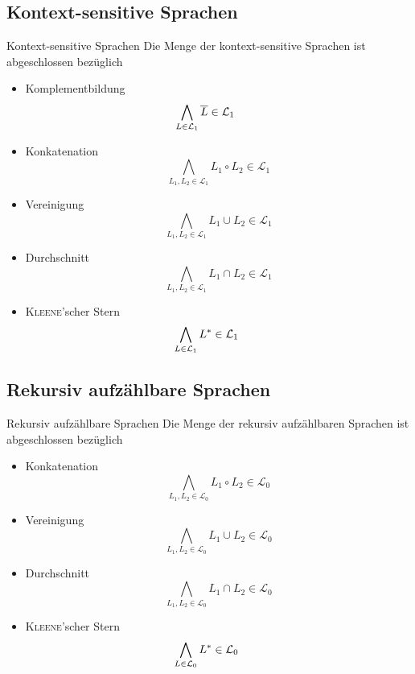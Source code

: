 \documentclass[]{beamer}
\begin{document}
\subsection{Kontext-sensitive Sprachen}
\begin{frame}[squeeze]{}
  \begin{block}{Kontext-sensitive Sprachen}
    Die Menge der kontext-sensitive Sprachen ist abgeschlossen bezüglich
    \begin{itemize}
      \item Komplementbildung
            \vspace*{-0.25em}
            \[\bigwedge_{L \in \mathcal{L}_1} \overline{L} \in \mathcal{L}_1 \hspace*{2.3em}\]
      \item Konkatenation
            \vspace*{-0.25em}
            \[\bigwedge_{L_1, L_2 \in \mathcal{L}_1} L_1 \circ L_2 \in \mathcal{L}_1\]
      \item Vereinigung
            \vspace*{-0.25em}
            \[\bigwedge_{L_1, L_2 \in \mathcal{L}_1} L_1 \cup L_2 \in \mathcal{L}_1\]
      \item Durchschnitt
            \vspace*{-0.25em}
            \[\bigwedge_{L_1, L_2 \in \mathcal{L}_1} L_1 \cap L_2 \in \mathcal{L}_1\]
      \item \textsc{Kleene}'scher Stern
            \vspace*{-0.25em}
            \[\bigwedge_{L \in \mathcal{L}_1} L^* \in \mathcal{L}_1 \hspace*{2.2em}\]
    \end{itemize}
  \end{block}
\end{frame}

\subsection{Rekursiv aufzählbare Sprachen}
\begin{frame}[squeeze]{}
  \begin{block}{Rekursiv aufzählbare Sprachen}
    Die Menge der rekursiv aufzählbaren Sprachen ist abgeschlossen bezüglich
    \begin{itemize}
      \item Konkatenation
            \[\bigwedge_{L_1, L_2 \in \mathcal{L}_0} L_1 \circ L_2 \in \mathcal{L}_0\]
      \item Vereinigung
            \[\bigwedge_{L_1, L_2 \in \mathcal{L}_0} L_1 \cup L_2 \in \mathcal{L}_0\]
      \item Durchschnitt
            \[\bigwedge_{L_1, L_2 \in \mathcal{L}_0} L_1 \cap L_2 \in \mathcal{L}_0\]
      \item \textsc{Kleene}'scher Stern
            \[\bigwedge_{L \in \mathcal{L}_0} L^* \in \mathcal{L}_0 \hspace*{2.2em}\]
    \end{itemize}
  \end{block}
\end{frame}
\end{document}
